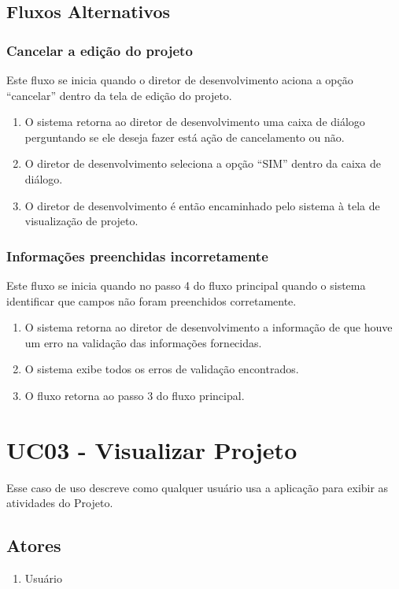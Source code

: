 \subsection{Fluxos Alternativos}

\subsubsection{Cancelar a edição do projeto}
Este fluxo se inicia quando o diretor de desenvolvimento aciona a opção “cancelar” dentro da tela de edição do projeto.

\begin{enumerate}
  \item O sistema retorna ao diretor de desenvolvimento uma caixa de diálogo perguntando se ele deseja fazer está ação de cancelamento ou não.
  \item O diretor de desenvolvimento seleciona a opção “SIM” dentro da caixa de diálogo.
  \item O diretor de desenvolvimento é então encaminhado pelo sistema à tela de visualização de projeto.
\end{enumerate}

\subsubsection{Informações preenchidas incorretamente}
Este fluxo se inicia quando no passo 4 do fluxo principal quando o sistema identificar que campos não foram preenchidos corretamente.

\begin{enumerate}
  \item O sistema retorna ao diretor de desenvolvimento a informação de que houve um erro na validação das informações fornecidas.
  \item O sistema exibe todos os erros de validação encontrados.
  \item O fluxo retorna ao passo 3 do fluxo principal.
\end{enumerate}

\section{UC03 - Visualizar Projeto}

Esse caso de uso descreve como qualquer usuário usa a aplicação para exibir as atividades do Projeto.

\subsection{Atores}
\begin{enumerate}
  \item Usuário
\end{enumerate}
